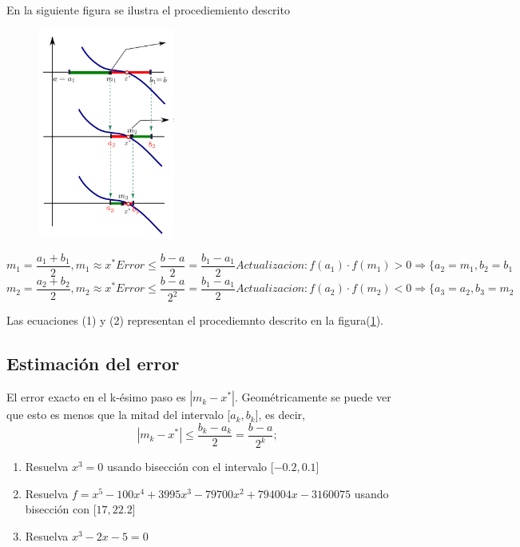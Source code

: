 \documentclass[12pt,a4paper]{article}
\begin{document}
En la siguiente figura se ilustra el procediemiento descrito
 \begin{figure}
 \centering
 \includegraphics [width =0.4\textwidth]{Grafi.png} \label{fig:Grafi}
 \end{figure}
 \begin{equation}
		m_{1}=\frac{a_{1}+b_{1}}{2}, m_{1}\approx x^*
		Error\leq \frac{b-a}{2} = \frac{b_{1}-a_{1}}{2} 
		Actualizacion: f(a_{1})\cdot f(m_{1})>0\Longrightarrow \{ a_{2}=m_{1}, b_{2}=b_{1}
	\end{equation} 
	\begin{equation}
		m_{2}=\frac{a_{2}+b_{2}}{2}, m_{2}\approx x^*
		Error\leq \frac{b-a}{2^2} = \frac{b_{1}-a_{1}}{2} 
		Actualizacion: f(a_{2})\cdot f(m_{2})<0\Longrightarrow \{ a_{3}=a_{2}, b_{3}=m_{2}
	\end{equation} 

Las ecuaciones (1) y (2) representan el procediemnto descrito en la figura(\ref{fig:Grafi}).


\subsection{Estimaci\'{o}n del error} \label{subsec:estimaciondelerror}
\onehalfspacing
El error exacto en el k-ésimo paso es $|m_{k}-x^*|$. Geométricamente se puede ver que esto es menos que la mitad del intervalo [$a_{k},b_{k}$], es decir,
\begin{equation}
|m_{k}-x^*|\leq \frac{ b_{k}-a_{k}}{2}= \frac{b-a}{2^k};
\end{equation}

\begin{enumerate}
		\item Resuelva $x^3=0$ usando bisección con el intervalo [$-0.2,0.1$]
		\item Resuelva $f=x^5-100x^4+3995x^3-79700x^2+794004x-3160075$ usando bisección con [$17,22.2$]
		\item Resuelva $x^3-2x-5=0$ 
\end{enumerate}
\end{document}
